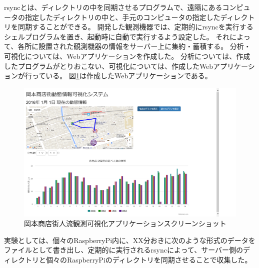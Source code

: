 rsyncとは、ディレクトリの中を同期させるプログラムで、遠隔にあるコンピュータの指定したディレクトリの中と、手元のコンピュータの指定したディレクトリを同期することができる。
開発した観測機器では、定期的にrsyncを実行するシェルプログラムを置き、起動時に自動で実行するよう設定した。
それによって、各所に設置された観測機器の情報をサーバー上に集約・蓄積する。
分析・可視化については、Webアプリケーションを作成した。
分析については、作成したプログラムがとりおこない、可視化については、作成したWebアプリケーションが行っている。
図\ref{fig:okamoto_ss}は作成したWebアプリケーションである。
\begin{figure}[htbp]
\includegraphics[width=16cm]{images/okamoto_scr1.png}
\caption{岡本商店街人流観測可視化アプリケーションスクリーンショット}
\label{fig:okamoto_ss}
\end{figure}


実験としては、個々のRaspberryPi内に、XX分おきに次のような形式のデータをファイルとして書き出し、定期的に実行されるrsyncによって、サーバー側のディレクトリと個々のRaspberryPiのディレクトリを同期させることで収集した。








